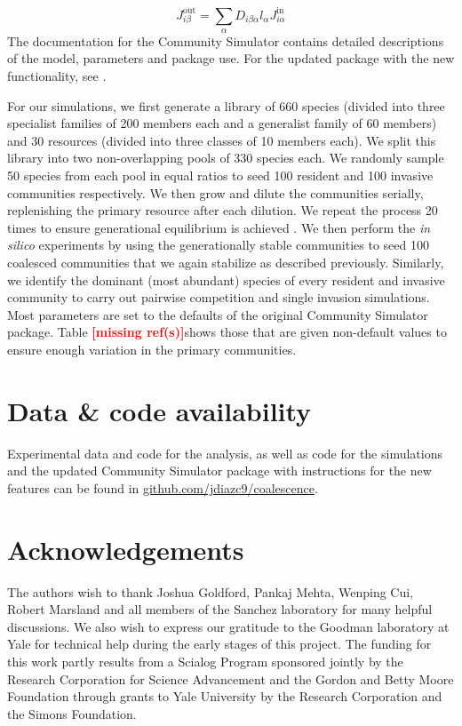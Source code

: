 \documentclass[a4paper,10pt]{article}
\newcommand{\mr}{\textcolor{red}{\textbf{[missing ref(s)]}}}
\begin{document}
\begin{equation}
J^{\mathrm{out}}_{i\beta} = \sum_\alpha D_{i\beta\alpha} l_\alpha J^{\mathrm{in}}_{i\alpha}
\label{eq:jout}
\end{equation}
%
The documentation for the Community Simulator contains detailed
descriptions of the model, parameters and package use. For the updated package with
the new functionality, see .

For our simulations,
we first generate a library of 660 species (divided into three specialist
families of 200 members each
and a generalist family of 60 members)
and 30 resources (divided into three classes of 10 members each).
We split this library into two non-overlapping pools of 330 species each.
We randomly sample 50 species from each pool in equal ratios to seed
100 resident and
100 invasive communities respectively.
We then grow and dilute the communities serially,
replenishing the primary
resource after each dilution.
We repeat the process 20 times to ensure generational equilibrium is
achieved \cite{Goldford2018}.
We then perform the \textit{in silico} experiments by using the
generationally stable communities to seed 100 coalesced communities
that we again stabilize as described previously.
Similarly, we identify the dominant (most
abundant) species of every resident and invasive community to carry out pairwise
competition and single invasion simulations.
Most parameters are set to the defaults of the original Community Simulator
package. Table \mr shows those that are given non-default values to ensure
enough variation in the primary communities.

\section*{Data \& code availability}\label{datacode}

Experimental data and code for the analysis, as well as code for the simulations
and the updated Community Simulator package with instructions for the
new features can be found in \url{github.com/jdiazc9/coalescence}.

\section*{Acknowledgements}

The authors wish to thank Joshua Goldford, Pankaj Mehta, Wenping Cui,
Robert Marsland and all members of the Sanchez laboratory
for many helpful discussions.
We also wish to express our gratitude to the Goodman laboratory at Yale
for technical help during the early stages of this project.
The funding for this work partly results from a Scialog Program
sponsored jointly by the Research Corporation for Science Advancement and
the Gordon and Betty Moore Foundation through grants to Yale University by the
Research Corporation and the Simons Foundation.
\end{document}
